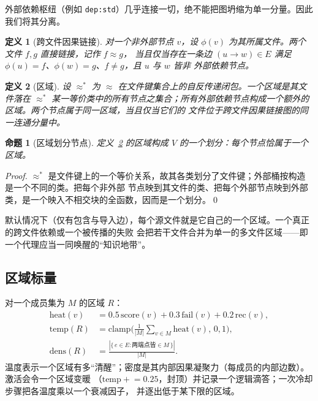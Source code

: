 \documentclass[11pt]{ctexart}
\newtheorem{definition}{定义}
\newtheorem{proposition}{命题}
\newcommand{\code}[1]{\texttt{#1}}
\begin{document}
外部依赖枢纽（例如 \code{dep:std}）几乎连接一切，绝不能把图坍缩为单一分量。因此我们将其分离。

\begin{definition}[跨文件因果链接]
对一个非外部节点 $v$，设 $\phi(v)$ 为其所属文件。两个文件 $f,g$ \emph{直接链接}，记作 $f \approx g$，
当且仅当存在一条边 $(u\!\to\!w)\in E$ 满足 $\phi(u)=f$、$\phi(w)=g$、$f\neq g$，且 $u$ 与 $w$ 皆非
外部依赖节点。
\end{definition}

\begin{definition}[区域]\label{def:region}
设 $\approx^{*}$ 为 $\approx$ 在文件键集合上的自反传递闭包。一个\emph{区域}是其文件落在 $\approx^{*}$
某一等价类中的所有节点之集合；所有外部依赖节点构成一个额外的区域。两个节点属于同一区域，当且仅当它们的
文件位于跨文件因果链接图的同一连通分量中。
\end{definition}

\begin{proposition}[区域划分节点]
定义~\ref{def:region} 的区域构成 $V$ 的一个划分：每个节点恰属于一个区域。
\end{proposition}
\begin{proof}
$\approx^{*}$ 是文件键上的一个等价关系，故其各类划分了文件键；外部桶按构造是一个不同的类。把每个非外部
节点映到其文件的类、把每个外部节点映到外部类，是一个映入不相交块的全函数，因而是一个划分。\qed
\end{proof}

默认情况下（仅有包含与导入边），每个源文件就是它自己的一个区域。一个真正的跨文件依赖或一个被传播的失败
会把若干文件合并为单一的多文件区域——即一个代理应当一同唤醒的“知识地带”。

\subsection{区域标量}

对一个成员集为 $M$ 的区域 $R$：
\begin{align}
\mathrm{heat}(v)        &= 0.5\,\mathrm{score}(v) + 0.3\,\mathrm{fail}(v) + 0.2\,\mathrm{rec}(v), \\
\mathrm{temp}(R)        &= \mathrm{clamp}\!\Big(\tfrac{1}{|M|}\textstyle\sum_{v\in M}\mathrm{heat}(v),\,0,1\Big), \label{eq:temp}\\
\mathrm{dens}(R)        &= \frac{|\{\,e\in E : \text{两端点皆} \in M\,\}|}{|M|}. \label{eq:dens}
\end{align}
温度表示一个区域有多“清醒”；密度是其内部因果凝聚力（每成员的内部边数）。激活会令一个区域变暖
（$\mathrm{temp}\mathrel{+}=0.25$，封顶）并记录一个逻辑滴答；一次冷却步骤把各温度乘以一个衰减因子，
并逐出低于某下限的区域。
\end{document}
